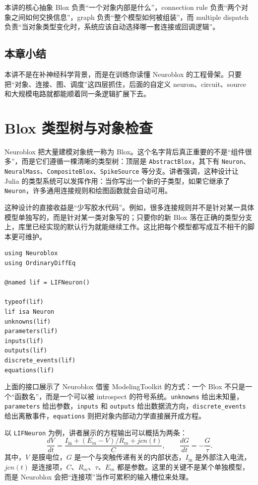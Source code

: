 \documentclass[a4paper]{article}
\begin{document}
\begin{knowledgebox}{本讲的核心抽象}
Blox 负责“一个对象内部是什么”，connection rule 负责“两个对象之间如何交换信息”，graph 负责“整个模型如何被组装”，而 multiple dispatch 负责“当对象类型变化时，系统应该自动选择哪一套连接或回调逻辑”。
\end{knowledgebox}

\subsection{本章小结}
本讲不是在补神经科学背景，而是在训练你读懂 Neuroblox 的工程骨架。只要把“对象、连接、图、调度”这四层抓住，后面的自定义 neuron、circuit、source 和大规模电路就都能顺着同一条逻辑扩展下去。

\section{Blox 类型树与对象检查}
Neuroblox 把大量建模对象统一称为 Blox。这个名字背后真正重要的不是“组件很多”，而是它们遵循一棵清晰的类型树：顶层是 \texttt{AbstractBlox}，其下有 \texttt{Neuron}、\texttt{NeuralMass}、\texttt{CompositeBlox}、\texttt{SpikeSource} 等分支。讲者强调，这种设计让 Julia 的类型系统可以发挥作用：当你写出一个新的子类型，如果它继承了 \texttt{Neuron}，许多通用连接规则和绘图函数就会自动可用。

这种设计的直接收益是“少写胶水代码”。例如，很多连接规则并不是针对某一具体模型单独写的，而是针对某一类对象写的；只要你的新 Blox 落在正确的类型分支上，库里已经实现的默认行为就能继续工作。这比把每个模型都写成互不相干的脚本更可维护。

\begin{lstlisting}[caption={检查一个 LIFNeuron 的典型接口}]
using Neuroblox
using OrdinaryDiffEq

@named lif = LIFNeuron()

typeof(lif)
lif isa Neuron
unknowns(lif)
parameters(lif)
inputs(lif)
outputs(lif)
discrete_events(lif)
equations(lif)
\end{lstlisting}

上面的接口展示了 Neuroblox 借鉴 ModelingToolkit 的方式：一个 Blox 不只是一个“函数名”，而是一个可以被 introspect 的符号系统。\texttt{unknowns} 给出未知量，\texttt{parameters} 给出参数，\texttt{inputs} 和 \texttt{outputs} 给出数据流方向，\texttt{discrete\_events} 给出离散事件，\texttt{equations} 则把对象内部动力学直接展开成方程。

以 \texttt{LIFNeuron} 为例，讲者展示的方程输出可以概括为两条：
\[
\frac{dV}{dt} = \frac{I_{\mathrm{in}} + (E_m - V)/R_m + jcn(t)}{C},
\qquad
\frac{dG}{dt} = -\frac{G}{\tau}.
\]
其中，\(V\) 是膜电位，\(G\) 是一个与突触传递有关的内部状态，\(I_{\mathrm{in}}\) 是外部注入电流，\(jcn(t)\) 是连接项，\(C\)、\(R_m\)、\(\tau\)、\(E_m\) 都是参数。这里的关键不是某个单独模型，而是 Neuroblox 会把“连接项”当作可累积的输入槽位来处理。
\end{document}
